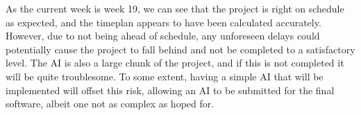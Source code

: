 \vspace{0.3cm}

As the current week is week 19, we can see that the project is right on
schedule as expected, and the timeplan appears to have been calculated
accurately. However, due to not being ahead of schedule, any unforeseen delays
could potentially cause the project to fall behind and not be completed to a
satisfactory level. The AI is also a large chunk of the project, and if this
is not completed it will be quite troublesome. To some extent, having a simple
AI that will be implemented will offset this risk, allowing an AI to be
submitted for the final software, albeit one not as complex as hoped for.
